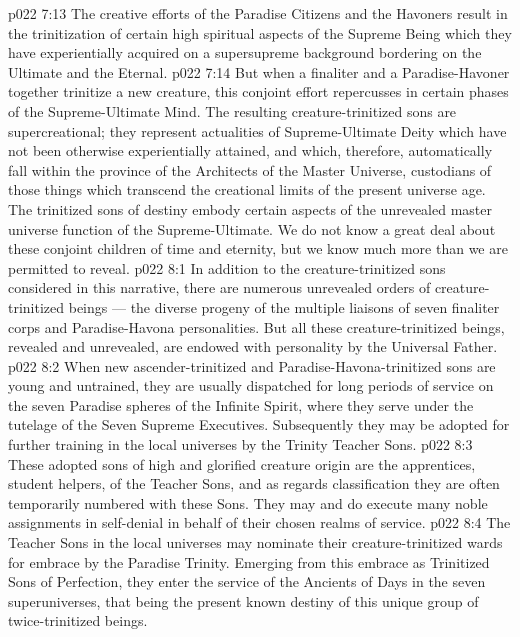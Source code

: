 \vs p022 7:13 \bibnobreakspace {} The creative efforts of the Paradise Citizens and the Havoners result in the trinitization of certain high spiritual aspects of the Supreme Being which they have experientially acquired on a supersupreme background bordering on the Ultimate and the Eternal.
\vs p022 7:14 \bibnobreakspace {} But when a finaliter and a Paradise\hyp{}Havoner together trinitize a new creature, this conjoint effort repercusses in certain phases of the Supreme\hyp{}Ultimate Mind. The resulting creature\hyp{}trinitized sons are supercreational; they represent actualities of Supreme\hyp{}Ultimate Deity which have not been otherwise experientially attained, and which, therefore, automatically fall within the province of the Architects of the Master Universe, custodians of those things which transcend the creational limits of the present universe age. The trinitized sons of destiny embody certain aspects of the unrevealed master universe function of the Supreme\hyp{}Ultimate. We do not know a great deal about these conjoint children of time and eternity, but we know much more than we are permitted to reveal.
\vs p022 8:1 In addition to the creature\hyp{}trinitized sons considered in this narrative, there are numerous unrevealed orders of creature\hyp{}trinitized beings --- the diverse progeny of the multiple liaisons of seven finaliter corps and Paradise\hyp{}Havona personalities. But all these creature\hyp{}trinitized beings, revealed and unrevealed, are endowed with personality by the Universal Father.
\vs p022 8:2 \pc When new ascender\hyp{}trinitized and Paradise\hyp{}Havona\hyp{}trinitized sons are young and untrained, they are usually dispatched for long periods of service on the seven Paradise spheres of the Infinite Spirit, where they serve under the tutelage of the Seven Supreme Executives. Subsequently they may be adopted for further training in the local universes by the Trinity Teacher Sons.
\vs p022 8:3 These adopted sons of high and glorified creature origin are the apprentices, student helpers, of the Teacher Sons, and as regards classification they are often temporarily numbered with these Sons. They may and do execute many noble assignments in self\hyp{}denial in behalf of their chosen realms of service.
\vs p022 8:4 The Teacher Sons in the local universes may nominate their creature\hyp{}trinitized wards for embrace by the Paradise Trinity. Emerging from this embrace as Trinitized Sons of Perfection, they enter the service of the Ancients of Days in the seven superuniverses, that being the present known destiny of this unique group of twice\hyp{}trinitized beings.
